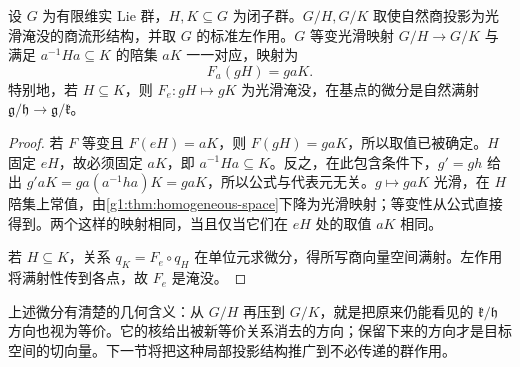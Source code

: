 \begin{proposition}\label{g1:prop:equivariant-homogeneous-maps}
	设 \(G\) 为有限维实 Lie 群，\(H,K\subseteq G\) 为闭子群。\(G/H,G/K\) 取使自然商投影为光滑淹没的商流形结构，并取 \(G\) 的标准左作用。\(G\) 等变光滑映射 \(G/H\to G/K\) 与满足 \(a^{-1}Ha\subseteq K\) 的陪集 \(aK\) 一一对应，映射为
	\[
		F_a(gH)=gaK.
	\]
	特别地，若 \(H\subseteq K\)，则 \(F_e:gH\mapsto gK\) 为光滑淹没，在基点的微分是自然满射 \(\mathfrak g/\mathfrak h\to\mathfrak g/\mathfrak k\)。
\end{proposition}
\begin{proof}
	若 \(F\) 等变且 \(F(eH)=aK\)，则 \(F(gH)=gaK\)，所以取值已被确定。\(H\) 固定 \(eH\)，故必须固定 \(aK\)，即 \(a^{-1}Ha\subseteq K\)。反之，在此包含条件下，\(g'=gh\) 给出 \(g'aK=ga(a^{-1}ha)K=gaK\)，所以公式与代表元无关。\(g\mapsto gaK\) 光滑，在 \(H\) 陪集上常值，由\cref{g1:thm:homogeneous-space}下降为光滑映射；等变性从公式直接得到。两个这样的映射相同，当且仅当它们在 \(eH\) 处的取值 \(aK\) 相同。

	若 \(H\subseteq K\)，关系 \(q_K=F_e\circ q_H\) 在单位元求微分，得所写商向量空间满射。左作用将满射性传到各点，故 \(F_e\) 是淹没。
\end{proof}

上述微分有清楚的几何含义：从 \(G/H\) 再压到 \(G/K\)，就是把原来仍能看见的 \(\mathfrak k/\mathfrak h\) 方向也视为等价。它的核给出被新等价关系消去的方向；保留下来的方向才是目标空间的切向量。下一节将把这种局部投影结构推广到不必传递的群作用。

